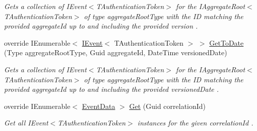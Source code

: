 \begin{DoxyCompactItemize}
\begin{DoxyCompactList}\small\item\em Gets a collection of I\+Event$<$\+T\+Authentication\+Token$>$ for the I\+Aggregate\+Root$<$\+T\+Authentication\+Token$>$ of type {\itshape aggregate\+Root\+Type}  with the ID matching the provided {\itshape aggregate\+Id}  up to and including the provided {\itshape version} . \end{DoxyCompactList}\item 
override I\+Enumerable$<$ \hyperlink{interfaceCqrs_1_1Events_1_1IEvent}{I\+Event}$<$ T\+Authentication\+Token $>$ $>$ \hyperlink{classCqrs_1_1Events_1_1MemoryCacheEventStore_a2913ce1088ce65a88046763a8f1a46d9_a2913ce1088ce65a88046763a8f1a46d9}{Get\+To\+Date} (Type aggregate\+Root\+Type, Guid aggregate\+Id, Date\+Time versioned\+Date)
\begin{DoxyCompactList}\small\item\em Gets a collection of I\+Event$<$\+T\+Authentication\+Token$>$ for the I\+Aggregate\+Root$<$\+T\+Authentication\+Token$>$ of type {\itshape aggregate\+Root\+Type}  with the ID matching the provided {\itshape aggregate\+Id}  up to and including the provided {\itshape versioned\+Date} . \end{DoxyCompactList}\item 
override I\+Enumerable$<$ \hyperlink{classCqrs_1_1Events_1_1EventData}{Event\+Data} $>$ \hyperlink{classCqrs_1_1Events_1_1MemoryCacheEventStore_a2a93a3f10423f608527fbc41a7ce8cef_a2a93a3f10423f608527fbc41a7ce8cef}{Get} (Guid correlation\+Id)
\begin{DoxyCompactList}\small\item\em Get all I\+Event$<$\+T\+Authentication\+Token$>$ instances for the given {\itshape correlation\+Id} . \end{DoxyCompactList}\end{DoxyCompactItemize}
